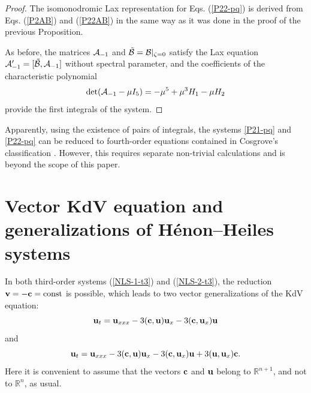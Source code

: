\documentclass[11pt]{article}
\theoremstyle{plain}
\theoremstyle{definition}
\begin{document}
\begin{proof}
The isomonodromic Lax representation for Eqs. (\ref{P22-pq}) is derived from Eqs. (\ref{P2AB}) and (\ref{P22AB}) in the same way as it was done in the proof of the previous Proposition. 

As before, the matrices ${\cal A}_{-1}$ and $\tilde{\cal B}={\cal B}|_{\zeta=0}$ satisfy the Lax equation ${\cal A}'_{-1}=[\tilde{\cal B},{\cal A}_{-1}]$ without spectral parameter, and the coefficients of the characteristic polynomial
\[
\det({\cal A}_{-1}-\mu I_5)=-\mu^5+\mu^3H_1-\mu H_2
\]
provide the first integrals of the system.
\end{proof}

Apparently, using the existence of pairs of integrals, the systems \eqref{P21-pq} and \eqref{P22-pq}  can be reduced to fourth-order equations contained in Cosgrove's classification \cite{Cosgrove_2000a}. However, this requires separate non-trivial calculations and is beyond the scope of this paper. 

\section{Vector KdV equation and generalizations of H\'enon–Heiles systems}\label{s:KdV}

In both third-order systems (\ref{NLS-1-t3}) and (\ref{NLS-2-t3}), the reduction ${\bf v}=-{\bf c}=\operatorname{const}$ is possible, which leads to two vector generalizations of the KdV equation:
\begin{equation}\label{KdVc-1}
 {\bf u}_t={\bf u}_{xxx}-3({\bf c},{\bf u}){\bf u}_x-3({\bf c},{\bf u}_x){\bf u} 
\end{equation}
and
\begin{equation}\label{KdVc}
 {\bf u}_t={\bf u}_{xxx}-3({\bf c},{\bf u}){\bf u}_x
  -3({\bf c},{\bf u}_x){\bf u}+3({\bf u},{\bf u}_x){\bf c}.    
\end{equation}
Here it is convenient to assume that the vectors ${\bf c}$ and ${\bf u}$ belong to ${\mathbb R}^{n+1}$, and not to ${\mathbb R}^n$, as usual.
\end{document}
